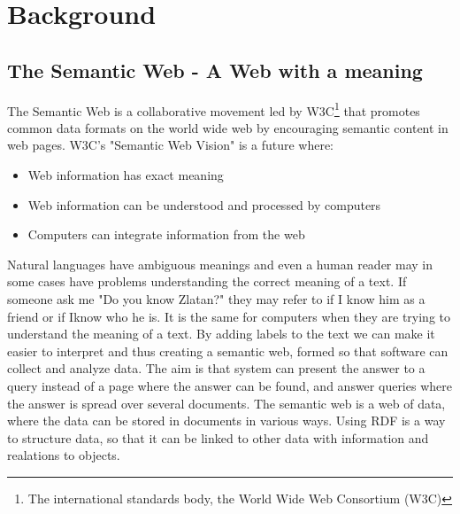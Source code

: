 \chapter{Background}

\section{The Semantic Web - A Web with a meaning} 
The Semantic Web is a collaborative movement led by W3C\footnote{The international standards body, the World Wide Web Consortium (W3C)} that promotes common data formats on the world wide web by encouraging semantic content in web pages. W3C's "Semantic Web Vision" is a future where: 
\begin{itemize}
\item Web information has exact meaning
\item Web information can be understood and processed by computers
\item Computers can integrate information from the web 
\end{itemize}

Natural languages have ambiguous meanings and even
a human reader may in some cases have problems understanding the correct
meaning of a text. If someone ask me  "Do you know Zlatan?" they may refer to if I know him as a friend or if Iknow who he is. It is the same for computers when they are trying to understand the meaning of a text. By adding labels to the text we can make it easier to interpret and thus creating a semantic web, formed so that software can collect and analyze data. The aim is that system can present the answer to a query instead of a page where the answer can be found, and answer queries where the answer is spread over several documents.
The semantic web is a web of data, where the data can be stored in documents in various ways. Using RDF is a way to structure data, so that it can be linked to other data with information and realations to objects.

